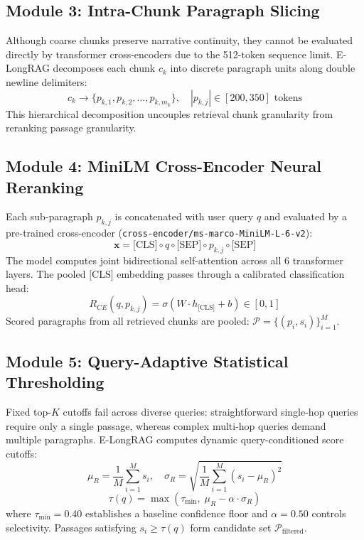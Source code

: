 \documentclass[lettersize,journal]{IEEEtran}
\begin{document}
\subsection{Module 3: Intra-Chunk Paragraph Slicing}
Although coarse chunks preserve narrative continuity, they cannot be evaluated directly by transformer cross-encoders due to the 512-token sequence limit. E-LongRAG decomposes each chunk $c_k$ into discrete paragraph units along double newline delimiters:
\begin{equation}
\label{eq:slicing}
c_k \longrightarrow \{ p_{k,1}, p_{k,2}, \dots, p_{k,m_k} \}, \quad |p_{k,j}| \in [200, 350] \text{ tokens}
\end{equation}
This hierarchical decomposition uncouples retrieval chunk granularity from reranking passage granularity.

\subsection{Module 4: MiniLM Cross-Encoder Neural Reranking}
Each sub-paragraph $p_{k,j}$ is concatenated with user query $q$ and evaluated by a pre-trained cross-encoder (\texttt{cross-encoder/ms-marco-MiniLM-L-6-v2}):
\begin{equation}
\label{eq:ce_input}
\mathbf{x} = \text{[CLS]} \circ q \circ \text{[SEP]} \circ p_{k,j} \circ \text{[SEP]}
\end{equation}
The model computes joint bidirectional self-attention across all 6 transformer layers. The pooled $\text{[CLS]}$ embedding passes through a calibrated classification head:
\begin{equation}
\label{eq:ce_score}
R_{CE}(q, p_{k,j}) = \sigma(W \cdot h_{\text{[CLS]}} + b) \in [0, 1]
\end{equation}
Scored paragraphs from all retrieved chunks are pooled: $\mathcal{P} = \{ (p_i, s_i) \}_{i=1}^M$.

\subsection{Module 5: Query-Adaptive Statistical Thresholding}
Fixed top-$K$ cutoffs fail across diverse queries: straightforward single-hop queries require only a single passage, whereas complex multi-hop queries demand multiple paragraphs. E-LongRAG computes dynamic query-conditioned score cutoffs:
\begin{equation}
\label{eq:mean_std}
\mu_R = \frac{1}{M} \sum_{i=1}^M s_i, \quad \sigma_R = \sqrt{\frac{1}{M} \sum_{i=1}^M (s_i - \mu_R)^2}
\end{equation}
\begin{equation}
\label{eq:tau_q}
\tau(q) = \max\left( \tau_{\min}, \; \mu_R - \alpha \cdot \sigma_R \right)
\end{equation}
where $\tau_{\min} = 0.40$ establishes a baseline confidence floor and $\alpha = 0.50$ controls selectivity. Passages satisfying $s_i \ge \tau(q)$ form candidate set $\mathcal{P}_{\text{filtered}}$.
\end{document}
